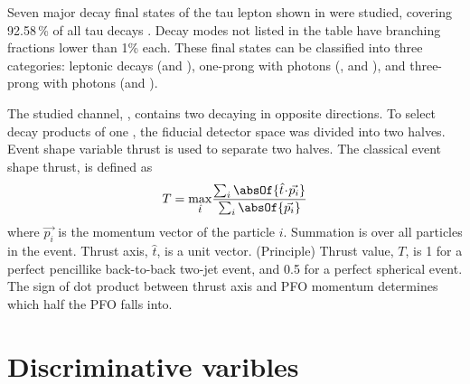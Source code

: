 Seven major decay final states of the tau lepton shown in  were studied, covering 92.58\,\% of all tau decays  \cite{Agashe:2014kda}.  Decay modes not listed in the table have branching fractions lower than 1\% each. These final states can be classified into three categories: leptonic decays (\decayElectron and \decayMuon), one-prong with photons (\decayPion, \decayRho and \decayAiPhoton), and three-prong with photons (\decayAiPion and \decayThreePionPhoton).

The studied channel, \eeToTauTau, contains two \Pgt decaying in opposite directions. To select decay products of one \Ptau, the fiducial detector space was divided into two halves. %
Event shape variable thrust is used to separate two halves. The classical event shape thrust\cite{PhysRevLett.39.1587}, is defined as
\begin{equation}
T = \max_{\hat{t}}\!\frac{\sum_{i}\absOf{\hat{t}\!\cdot\!\vec{p_{i}}}}{\sum_{i}\absOf{\vec{p_{i}}}}
\end{equation}
where $\vec{p_{i}}$ is the momentum vector of the particle $i$. Summation is over all particles in the event. Thrust axis, $\hat{t}$, is a unit vector. (Principle) Thrust value, $T$, is 1 for a perfect pencillike back-to-back two-jet event, and 0.5 for a perfect spherical event. The sign of dot product between thrust axis and PFO momentum determines which half the PFO falls into.


\section{Discriminative varibles}

